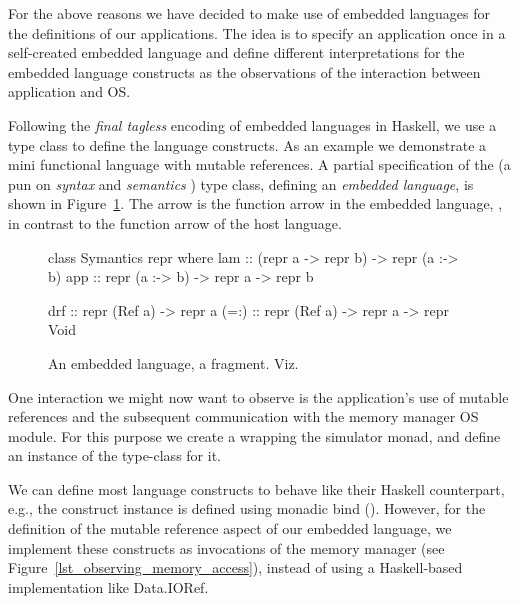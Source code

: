 For the above reasons we have decided to make use of embedded languages for the definitions of our applications.
The idea is to specify an application once in a self-created embedded language and define different interpretations for the embedded language constructs as the observations of the interaction between application and OS\nolinebreak[3]  \cite{Hofer:2008:PED:1449913.1449935}.

Following the \emph{final tagless} \cite{final_tagless_embedding} encoding of embedded languages in Haskell, we use a type class to define the language constructs.
As an example we demonstrate a mini functional language with mutable references.
A partial specification of the  (a pun on \emph{syntax} and \emph{semantics} \cite{final_tagless_embedding}) type class, defining an \emph{embedded language}, is shown in Figure~\ref{fig:embedded_language_interface}.
The arrow \hs{:->} is the function arrow in the embedded language, \eg {}, in contrast to the function arrow \hs{->} of the host language.

\begin{figure}
\begin{code}
class Symantics repr where
  lam   :: (repr a -> repr b) -> repr (a :-> b)
  app   :: repr (a :-> b) -> repr a -> repr b

  drf   :: repr (Ref a) -> repr a
  (=:)  :: repr (Ref a) -> repr a -> repr Void
\end{code}
\caption{An embedded language, a fragment. Viz.~\cite{final_tagless_embedding}}
\label{fig:embedded_language_interface}
\end{figure}

One interaction we might now want to observe is the application's use of mutable references and the subsequent communication with the memory manager OS module.
For this purpose we create a  wrapping the simulator monad, and define an instance of the  type-class for it.

We can define most language constructs to behave like their Haskell counterpart, e.g., the  construct instance is defined using monadic bind (\hs{>>=}\xspace).
However, for the definition of the mutable reference aspect of our embedded language, we implement these constructs as invocations of the memory manager (see Figure~\ref{lst_observing_memory_access}),
instead of using a Haskell-based implementation like \textsf{Data.IORef}.

